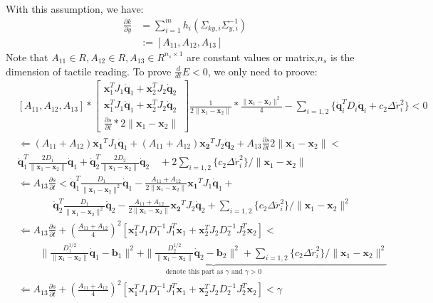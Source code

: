 \documentclass[]{article}
\begin{document}
With this assumption, we have:
\begin{align}
\frac{\partial k}{\partial y} &= \sum_{i=1}^{m}h_i(\Sigma_{ky,i}\Sigma^{-1}_{y,i})\\
 & :=[A_{11},A_{12},A_{13}]
\end{align}
Note that $A_{11}\in R,A_{12}\in R,A_{13}\in R^{n_s\times 1}$ are constant values or matrix,$n_s$ is the dimension of tactile reading.
To prove $\frac{d}{dt}E<0$, we only need to proove:
\begin{align}
&[A_{11},A_{12},A_{13}]*\begin{bmatrix}
\mathbf{x}_1^TJ_1\mathbf{\dot q}_1+\mathbf{x}_2^TJ_2\mathbf{\dot q}_2\\
\mathbf{x}_1^TJ_1\mathbf{\dot q}_1+\mathbf{x}_2^TJ_2\mathbf{\dot q}_2\\
\frac{\partial s}{\partial t}*2\|\mathbf{x}_1-\mathbf{x}_2\|
\end{bmatrix}\frac{1}{2\|\mathbf{x}_1-\mathbf{x}_2\|}*\frac{\|\mathbf{x}_1-\mathbf{x}_2\|^2}{4}-\sum\limits_{i=1,2}\{\mathbf{\dot{q}}_i^TD_i\mathbf{\dot{q}}_i+c_2\Delta \dot{r}_i^2\}<0\\
&\Leftarrow (A_{11}+A_{12})\mathbf{x_1}^TJ_1\mathbf{\dot q}_1+(A_{11}+A_{12})\mathbf{x_2}^TJ_2\mathbf{\dot q}_2+A_{13}\frac{\partial s}{\partial t}2\|\mathbf{x}_1-\mathbf{x}_2\|< \nonumber\\
&\mathbf{\dot q}_1^T\frac{2D_1}{\|\mathbf{x}_1-\mathbf{x}_2\|}\mathbf{\dot q}_1+\mathbf{\dot q}_2^T\frac{2D_2}{\|\mathbf{x}_1-\mathbf{x}_2\|}\mathbf{\dot q}_2 \quad +2\sum\limits_{i=1,2}\{c_2\Delta \dot{r}_i^2\}/\|\mathbf{x}_1-\mathbf{x}_2\|\\
&\Leftarrow A_{13}\frac{\partial s}{\partial t}<\mathbf{\dot q}_1^T\frac{D_1}{\|\mathbf{x}_1-\mathbf{x}_2\|^2}\mathbf{\dot q}_1-\frac{A_{11}+A_{12}}{2\|\mathbf{x}_1-\mathbf{x}_2\|}\mathbf{x_1}^TJ_1\mathbf{\dot q}_1+ \nonumber\\
&~~~~~~~~~~~~~~~~\mathbf{\dot q}_2^T\frac{D_1}{\|\mathbf{x}_1-\mathbf{x}_2\|^2}\mathbf{\dot q}_2-\frac{A_{11}+A_{12}}{2\|\mathbf{x}_1-\mathbf{x}_2\|}\mathbf{x_2}^TJ_2\mathbf{\dot q}_2+\sum\limits_{i=1,2}\{c_2\Delta \dot{r}_i^2\}/\|\mathbf{x}_1-\mathbf{x}_2\|^2\\
&\Leftarrow A_{13}\frac{\partial s}{\partial t}+ (\frac{A_{11}+A_{12}}{4})^2[\mathbf{x}_1^TJ_1D_1^{-1}J_1^T\mathbf{x}_1+\mathbf{x}_2^TJ_2D_2^{-1}J_2^T\mathbf{x}_2]< \nonumber \\
&~~~~~~~~~~\underbrace{\| \frac{D_1^{1/2}}{\|\mathbf{x}_1-\mathbf{x}_2\|}\mathbf{\dot q}_1-\mathbf{b}_1\|^2+\| \frac{D_2^{1/2}}{\|\mathbf{x}_1-\mathbf{x}_2\|}\mathbf{\dot q}_2-\mathbf{b}_2\|^2+\sum\limits_{i=1,2}\{c_2\Delta \dot{r}_i^2\}/\|\mathbf{x}_1-\mathbf{x}_2\|^2}_{\text{denote this part as $\gamma$ and $\gamma>0$}}\\
&\Leftarrow A_{13}\frac{\partial s}{\partial t}+ (\frac{A_{11}+A_{12}}{4})^2[\mathbf{x}_1^TJ_1D_1^{-1}J_1^T\mathbf{x}_1+\mathbf{x}_2^TJ_2D_2^{-1}J_2^T\mathbf{x}_2]< \gamma \label{eqn::proof}
\end{align}
\end{document}
